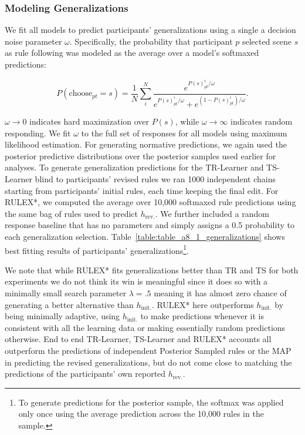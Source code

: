 \documentclass[doc,natbib,floatsintext]{apa7}
\newcommand{\hr}{h_{\mathrm{rev.}}}
\newcommand{\hi}{h_{\mathrm{init.}}}
\begin{document}
\begin{appendices}
\subsubsection{Modeling Generalizations}

We fit all models to predict participants' generalizations using a single a decision noise parameter \(\omega\). Specifically, the probability that participant $p$ selected scene $s$ as rule following was modeled as the average over a model's softmaxed predictions: 

\begin{equation}
    P(\mathrm{choose}_{pt}=s) = \frac{1}{N}\sum_i^N \frac{e^{P(s)^i_{pt}/\omega}}{e^{P(s)^i_{pt}/\omega} + e^{(1-P(s)^i_{pt})/\omega}}.
\label{equ:equ_a8_1_softmax}
\end{equation}

$\omega\rightarrow 0$ indicates hard maximization over $P(s)$, while $\omega\rightarrow\infty$ indicates random responding. We fit $\omega$ to the full set of responses for all models using maximum likelihood estimation. For generating normative predictions, we again used the posterior predictive distributions over the posterior samples used earlier for analyses. To generate generalization predictions for the TR-Learner and TS-Learner blind to participants' revised rules we ran 1000 independent chains starting from participants' initial rules, each time keeping the final edit. For RULEX*, we computed the average over 10,000 softmaxed rule predictions using the same bag of rules used to predict $\hr$. We further included a random response baseline that has no parameters and simply assigns a 0.5 probability to each generalization selection. Table~\ref{table:table_a8_1_generalizations} shows best fitting results of participants' generalizations\footnote{To generate predictions for the posterior sample, the softmax was applied only once using the average prediction across the 10,000 rules in the sample.}. 

We note that while RULEX* fits generalizations better than TR and TS for both experiments we do not think its win is meaningful since it does so with a minimally small search parameter $\lambda = .5$ meaning it has almost zero chance of generating a better alternative than $\hi$. RULEX* here outperforms $\hi$ by being minimally adaptive, using $\hi$ to make predictions whenever it is consistent with all the learning data or making essentially random predictions otherwise. End to end TR-Learner, TS-Learner and RULEX* accounts all outperform the predictions of independent Posterior Sampled rules or the MAP in predicting the revised generalizations, but do not come close to matching the predictions of the participants' own reported $\hr$.


\end{appendices}
\end{document}
